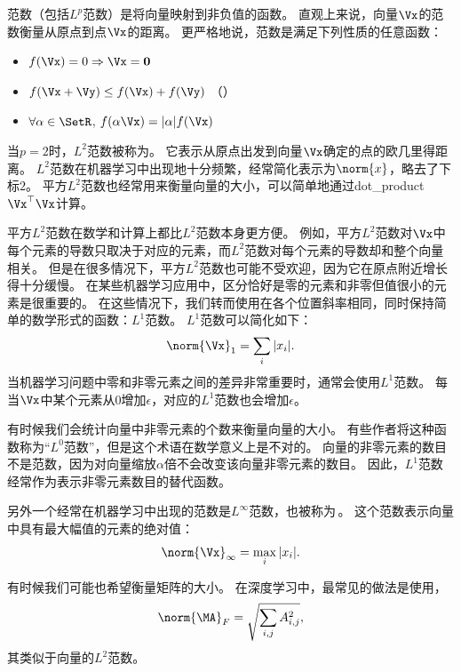 

范数（包括$L^p$范数）是将向量映射到非负值的函数。
直观上来说，向量$\Vx$的范数衡量从原点到点$\Vx$的距离。
更严格地说，范数是满足下列性质的任意函数：
\begin{itemize}
\item $f(\Vx) = 0 \Rightarrow \Vx = \mathbf{0}$ 
\item $f(\Vx + \Vy) \leq f(\Vx) + f(\Vy)$ （）
\item $\forall \alpha \in \SetR$, $f(\alpha \Vx) = |\alpha| f(\Vx)$
\end{itemize}


当$p=2$时，$L^2$范数被称为。
它表示从原点出发到向量$\Vx$确定的点的欧几里得距离。
$L^2$范数在机器学习中出现地十分频繁，经常简化表示为$\norm{x}$，略去了下标$2$。
平方$L^2$范数也经常用来衡量向量的大小，可以简单地通过\gls{dot_product} $\Vx^\top\Vx$计算。


平方$L^2$范数在数学和计算上都比$L^2$范数本身更方便。
例如，平方$L^2$范数对$\Vx$中每个元素的导数只取决于对应的元素，而$L^2$范数对每个元素的导数却和整个向量相关。
但是在很多情况下，平方$L^2$范数也可能不受欢迎，因为它在原点附近增长得十分缓慢。
在某些机器学习应用中，区分恰好是零的元素和非零但值很小的元素是很重要的。
在这些情况下，我们转而使用在各个位置斜率相同，同时保持简单的数学形式的函数：$L^1$范数。
$L^1$范数可以简化如下：
\begin{equation}
    \norm{\Vx}_1 = \sum_i  |x_i|.
\end{equation}
当机器学习问题中零和非零元素之间的差异非常重要时，通常会使用$L^1$范数。
每当$\Vx$中某个元素从$0$增加$\epsilon$，对应的$L^1$范数也会增加$\epsilon$。


有时候我们会统计向量中非零元素的个数来衡量向量的大小。
有些作者将这种函数称为``$L^0$范数''，但是这个术语在数学意义上是不对的。
向量的非零元素的数目不是范数，因为对向量缩放$\alpha$倍不会改变该向量非零元素的数目。
因此，$L^1$范数经常作为表示非零元素数目的替代函数。





另外一个经常在机器学习中出现的范数是$L^\infty$范数，也被称为\,。
这个范数表示向量中具有最大幅值的元素的绝对值：
\begin{equation}
    \norm{\Vx}_\infty = \max_i |x_i|.
\end{equation}


有时候我们可能也希望衡量矩阵的大小。
在深度学习中，最常见的做法是使用，
\begin{equation}
    \norm{\MA}_F = \sqrt{\sum_{i,j} A_{i,j}^2}, 
\end{equation}
其类似于向量的$L^2$范数。


